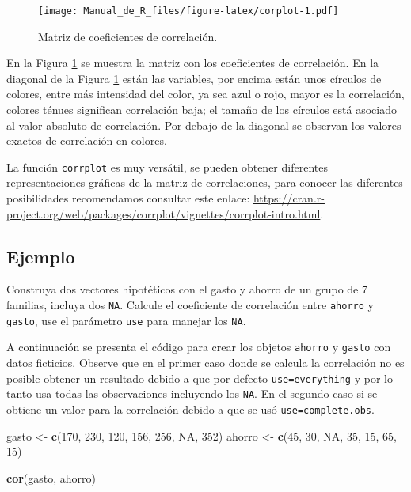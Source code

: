 \documentclass[10pt,]{krantz}
\makeatletter
\newenvironment{Shaded}{\begin{snugshade}}{\end{snugshade}}
\newcommand{\KeywordTok}[1]{\textcolor[rgb]{0.13,0.29,0.53}{\textbf{{#1}}}}
\newcommand{\DecValTok}[1]{\textcolor[rgb]{0.00,0.00,0.81}{{#1}}}
\newcommand{\StringTok}[1]{\textcolor[rgb]{0.31,0.60,0.02}{{#1}}}
\newcommand{\OtherTok}[1]{\textcolor[rgb]{0.56,0.35,0.01}{{#1}}}
\newcommand{\NormalTok}[1]{{#1}}
\newenvironment{kframe}{%
\medskip{}
\setlength{\fboxsep}{.8em}
 \def\at@end@of@kframe{}%
 \ifinner\ifhmode%
  \def\at@end@of@kframe{\end{minipage}}%
  \begin{minipage}{\columnwidth}%
 \fi\fi%
 \def\FrameCommand##1{\hskip\@totalleftmargin \hskip-\fboxsep
 \colorbox{shadecolor}{##1}\hskip-\fboxsep
     \hskip-\linewidth \hskip-\@totalleftmargin \hskip\columnwidth}%
 \MakeFramed {\advance\hsize-\width
   \@totalleftmargin\z@ \linewidth\hsize
   \@setminipage}}%
 {\par\unskip\endMakeFramed%
 \at@end@of@kframe}
\renewenvironment{Shaded}{\begin{kframe}}{\end{kframe}}
\let\BeginKnitrBlock\begin \let\EndKnitrBlock\end
\makeatother
\begin{document}
\begin{figure}[htbp]
\centering
\texttt{[image: Manual\_de\_R\_files/figure-latex/corplot-1.pdf]}
\caption{\label{fig:corplot}Matriz de coeficientes de correlación.}
\end{figure}

En la Figura \ref{fig:corplot} se muestra la matriz con los coeficientes
de correlación. En la diagonal de la Figura \ref{fig:corplot} están las
variables, por encima están unos círculos de colores, entre más
intensidad del color, ya sea azul o rojo, mayor es la correlación,
colores ténues significan correlación baja; el tamaño de los círculos
está asociado al valor absoluto de correlación. Por debajo de la
diagonal se observan los valores exactos de correlación en colores.

\BeginKnitrBlock{rmdtip}
La función \texttt{corrplot} es muy versátil, se pueden obtener
diferentes representaciones gráficas de la matriz de correlaciones, para
conocer las diferentes posibilidades recomendamos consultar este enlace:
\url{https://cran.r-project.org/web/packages/corrplot/vignettes/corrplot-intro.html}.
\EndKnitrBlock{rmdtip}

\subsection*{Ejemplo}\label{ejemplo-46}


Construya dos vectores hipotéticos con el gasto y ahorro de un grupo de
7 familias, incluya dos \texttt{NA}. Calcule el coeficiente de
correlación entre \texttt{ahorro} y \texttt{gasto}, use el parámetro
\texttt{use} para manejar los \texttt{NA}.

A continuación se presenta el código para crear los objetos
\texttt{ahorro} y \texttt{gasto} con datos ficticios. Observe que en el
primer caso donde se calcula la correlación no es posible obtener un
resultado debido a que por defecto
\texttt{use=\textquotesingle{}everything\textquotesingle{}} y por lo
tanto usa todas las observaciones incluyendo los \texttt{NA}. En el
segundo caso si se obtiene un valor para la correlación debido a que se
usó \texttt{use=\textquotesingle{}complete.obs\textquotesingle{}}.

\begin{Shaded}
\begin{Highlighting}[]
\NormalTok{gasto <-}\StringTok{ }\KeywordTok{c}\NormalTok{(}\DecValTok{170}\NormalTok{, }\DecValTok{230}\NormalTok{, }\DecValTok{120}\NormalTok{, }\DecValTok{156}\NormalTok{, }\DecValTok{256}\NormalTok{, }\OtherTok{NA}\NormalTok{, }\DecValTok{352}\NormalTok{)}
\NormalTok{ahorro <-}\StringTok{ }\KeywordTok{c}\NormalTok{(}\DecValTok{45}\NormalTok{, }\DecValTok{30}\NormalTok{, }\OtherTok{NA}\NormalTok{, }\DecValTok{35}\NormalTok{, }\DecValTok{15}\NormalTok{, }\DecValTok{65}\NormalTok{, }\DecValTok{15}\NormalTok{)}

\KeywordTok{cor}\NormalTok{(gasto, ahorro)}
\end{Highlighting}
\end{Shaded}
\end{document}
